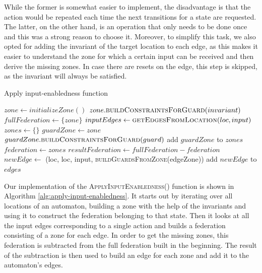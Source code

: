 While the former is somewhat easier to implement, the disadvantage is that the action would be repeated each time the next transitions for a state are requested. The latter, on the other hand, is an operation that only needs to be done once and this was a strong reason to choose it. Moreover, to simplify this task, we also opted for adding the invariant of the target location to each edge, as this makes it easier to understand the zone for which a certain input can be received and then derive the missing zones. In case there are resets on the edge, this step is skipped, as the invariant will always be satisfied.

\begin{algorithm}[H]
\caption{Apply input-enabledness function}
\label{alg:apply-input-enabledness}
\begin{algorithmic}[1]
    \State $zone \gets initializeZone()$
    \State
        \State $zone.\textsc{buildConstraintsForGuard}(invariant)$
    \EndFor
    \State $fullFederation \gets \{zone\}$
    \State
        \State $inputEdges \gets \textsc{getEdgesFromLocation}(loc, input)$
        \State $zones \gets \{\}$
            \State $guardZone \gets zone$
                \State $guardZone.\textsc{buildConstraintsForGuard}(guard)$
            \EndFor
            \State add $guardZone$ to $zones$
        \EndFor
        \State
        \State $federation \gets zones$
        \State $resultFederation \gets fullFederation - federation$
        \State
            \State $newEdge \gets$ (loc, loc, input, \textsc{buildGuardsFromZone}(edgeZone))
            \State add $newEdge$ to $edges$
        \EndFor
    \EndFor
\EndFor
\EndFunction
\end{algorithmic}
\end{algorithm}

Our implementation of the \textsc{ApplyInputEnabledness()} function is shown in Algorithm \ref{alg:apply-input-enabledness}. It starts out by iterating over all locations of an automaton, building a zone with the help of the invariants and using it to construct the federation belonging to that state. Then it looks at all the input edges corresponding to a single action and builds a federation consisting of a zone for each edge. In order to get the missing zones, this federation is subtracted from the full federation built in the beginning. The result of the subtraction is then used to build an edge for each zone and add it to the automaton's edges.

